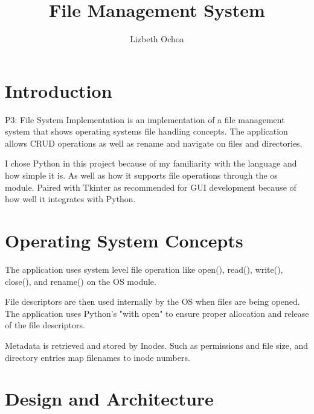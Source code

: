 \documentclass[12pt]{article}
\title{File Management System}
\author{Lizbeth Ochoa}
\date{}
\begin{document}
\maketitle

\section{Introduction}
P3: File System Implementation is an implementation of a file management system that shows operating systems file handling concepts. The application allows CRUD operations as well as rename and navigate on files and directories.

I chose Python in this project because of my familiarity with the language and how simple it is. As well as how it supports file operations through the os module. Paired with Tkinter as recommended for GUI development because of how well it integrates with Python.

\section{Operating System Concepts}
The application uses system level file operation like open(), read(), write(), close(), and rename() on the OS module.

File descriptors are then used internally by the OS when files are being opened. The application uses Python's "with open" to ensure proper allocation and release of the file descriptors.

Metadata is retrieved and stored by Inodes. Such as permissions and file size, and directory entries map filenames to inode numbers.

\section{Design and Architecture}

\begin{center}
\end{center}
\end{document}
